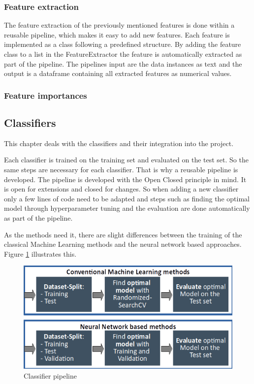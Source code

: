\subsubsection*{Feature extraction}
The feature extraction of the previously mentioned features is done within a reusable pipeline, which makes it easy to add new features. Each feature is implemented as a class following a predefined structure. By adding the feature class to a list in the Feature\-Extractor the feature is automatically extracted as part of the pipeline. The pipelines input are the data instances as text and the output is a dataframe containing all extracted features as numerical values.

\subsubsection*{Feature importances}

\subsection{Classifiers}
\label{ch:approachE}

This chapter deals with the classifiers and their integration into the project.

Each classifier is trained on the training set and evaluated on the test set. So the same steps are necessary for each classifier. That is why a reusable pipeline is developed. The pipeline is developed with the Open Closed principle in mind. It is open for extensions and closed for changes. So when adding a new classifier only a few lines of code need to be adapted and steps such as finding the optimal model through hyperparameter tuning and the evaluation are done automatically as part of the pipeline.

As the methods need it, there are slight differences between the training of the classical Machine Learning methods and the neural network based approaches. Figure \ref{fig:classifier_pipeline} illustrates this.

\begin{figure}[ht]
	\centering
	\includegraphics[width=0.7\linewidth]{figures/classifier_pipeline.png}
	\caption{Classifier pipeline}
	\label{fig:classifier_pipeline}
\end{figure}

